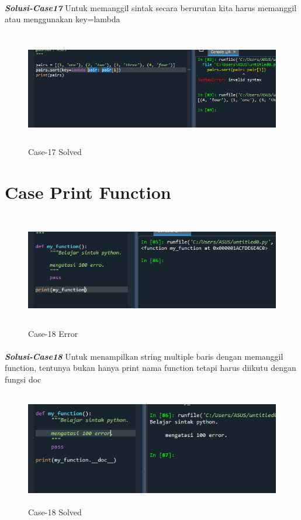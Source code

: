 \documentclass[12pt,a4paper]{article}
\begin{document}
\paragraph{}\textbf{\textit{Solusi-Case17}} {Untuk memanggil sintak secara berurutan kita harus memanggil atau menggunakan key=lambda}
\begin{figure}[ht]
    \centerline{\includegraphics[width=15cm,height=5cm]{image/case17-solved.png}}
    \renewcommand{\figurename}{Gambar}
    \caption{Case-17 Solved}
\end{figure}

\newpage
\section{Case Print Function}
\begin{figure}[ht]
    \centerline{\includegraphics[width=15cm,height=5cm]{image/case18.png}}
    \renewcommand{\figurename}{Gambar}
    \caption{Case-18 Error}
\end{figure}
\paragraph{}\textbf{\textit{Solusi-Case18}} {Untuk menampilkan string multiple baris dengan memanggil function, tentunya bukan hanya print nama function tetapi harus diikutu dengan fungsi doc}
\begin{figure}[ht]
    \centerline{\includegraphics[width=15cm,height=5cm]{image/case18-solved.png}}
    \renewcommand{\figurename}{Gambar}
    \caption{Case-18 Solved}
\end{figure}
\end{document}
